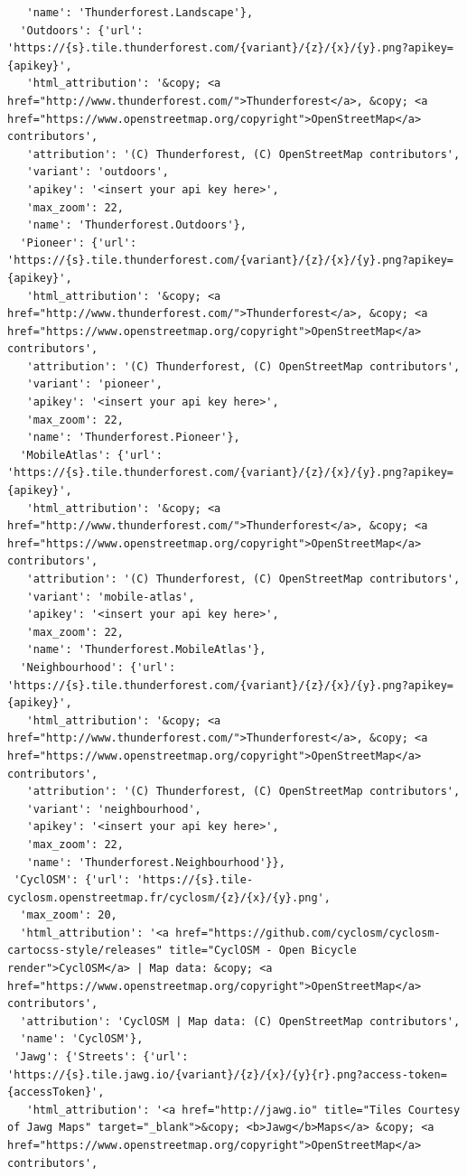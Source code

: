 \documentclass[
  letterpaper,
  DIV=11,
  numbers=noendperiod]{scrreprt}
\begin{document}
\begin{verbatim}
   'name': 'Thunderforest.Landscape'},
  'Outdoors': {'url': 'https://{s}.tile.thunderforest.com/{variant}/{z}/{x}/{y}.png?apikey={apikey}',
   'html_attribution': '&copy; <a href="http://www.thunderforest.com/">Thunderforest</a>, &copy; <a href="https://www.openstreetmap.org/copyright">OpenStreetMap</a> contributors',
   'attribution': '(C) Thunderforest, (C) OpenStreetMap contributors',
   'variant': 'outdoors',
   'apikey': '<insert your api key here>',
   'max_zoom': 22,
   'name': 'Thunderforest.Outdoors'},
  'Pioneer': {'url': 'https://{s}.tile.thunderforest.com/{variant}/{z}/{x}/{y}.png?apikey={apikey}',
   'html_attribution': '&copy; <a href="http://www.thunderforest.com/">Thunderforest</a>, &copy; <a href="https://www.openstreetmap.org/copyright">OpenStreetMap</a> contributors',
   'attribution': '(C) Thunderforest, (C) OpenStreetMap contributors',
   'variant': 'pioneer',
   'apikey': '<insert your api key here>',
   'max_zoom': 22,
   'name': 'Thunderforest.Pioneer'},
  'MobileAtlas': {'url': 'https://{s}.tile.thunderforest.com/{variant}/{z}/{x}/{y}.png?apikey={apikey}',
   'html_attribution': '&copy; <a href="http://www.thunderforest.com/">Thunderforest</a>, &copy; <a href="https://www.openstreetmap.org/copyright">OpenStreetMap</a> contributors',
   'attribution': '(C) Thunderforest, (C) OpenStreetMap contributors',
   'variant': 'mobile-atlas',
   'apikey': '<insert your api key here>',
   'max_zoom': 22,
   'name': 'Thunderforest.MobileAtlas'},
  'Neighbourhood': {'url': 'https://{s}.tile.thunderforest.com/{variant}/{z}/{x}/{y}.png?apikey={apikey}',
   'html_attribution': '&copy; <a href="http://www.thunderforest.com/">Thunderforest</a>, &copy; <a href="https://www.openstreetmap.org/copyright">OpenStreetMap</a> contributors',
   'attribution': '(C) Thunderforest, (C) OpenStreetMap contributors',
   'variant': 'neighbourhood',
   'apikey': '<insert your api key here>',
   'max_zoom': 22,
   'name': 'Thunderforest.Neighbourhood'}},
 'CyclOSM': {'url': 'https://{s}.tile-cyclosm.openstreetmap.fr/cyclosm/{z}/{x}/{y}.png',
  'max_zoom': 20,
  'html_attribution': '<a href="https://github.com/cyclosm/cyclosm-cartocss-style/releases" title="CyclOSM - Open Bicycle render">CyclOSM</a> | Map data: &copy; <a href="https://www.openstreetmap.org/copyright">OpenStreetMap</a> contributors',
  'attribution': 'CyclOSM | Map data: (C) OpenStreetMap contributors',
  'name': 'CyclOSM'},
 'Jawg': {'Streets': {'url': 'https://{s}.tile.jawg.io/{variant}/{z}/{x}/{y}{r}.png?access-token={accessToken}',
   'html_attribution': '<a href="http://jawg.io" title="Tiles Courtesy of Jawg Maps" target="_blank">&copy; <b>Jawg</b>Maps</a> &copy; <a href="https://www.openstreetmap.org/copyright">OpenStreetMap</a> contributors',

\end{verbatim}
\end{document}
